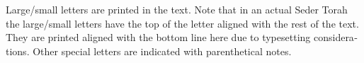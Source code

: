 \begin{minipage}{\textwidth}
\begin{english}
		Large/small letters are printed in the text.  Note that in an actual Seder Torah the large/small letters have the top of the letter aligned with the rest of the text. They are printed aligned with the bottom line here due to typesetting considerations. Other special letters are indicated with parenthetical notes.
		
	\end{english}
	
\end{minipage}


%
%	
%
